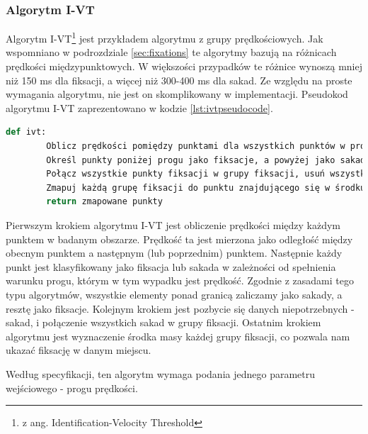 \subsubsection{Algorytm I-VT}
\label{ssec:ivt}
Algorytm I-VT\footnote{z ang. Identification-Velocity Threshold} jest przykładem algorytmu z grupy prędkościowych. Jak wspomniano w podrozdziale \ref{sec:fixations} te algorytmy bazują na różnicach prędkości międzypunktowych. W większości przypadków te różnice wynoszą mniej niż 150 ms dla fiksacji, a więcej niż 300-400 ms dla sakad. Ze względu na proste wymagania algorytmu, nie jest on skomplikowany w implementacji. Pseudokod algorytmu I-VT zaprezentowano w kodzie \ref{lst:ivtpseudocode}.
\begin{lstlisting}[language=Python, caption=Pseudokod algorytmu I-VT, label={lst:ivtpseudocode}]
    def ivt:
        Oblicz prędkości pomiędzy punktami dla wszystkich punktów w protokole
        Określ punkty poniżej progu jako fiksacje, a powyżej jako sakady
        Połącz wszystkie punkty fiksacji w grupy fiksacji, usuń wszystkie sakady
        Zmapuj każdą grupę fiksacji do punktu znajdującego się w środku każdej grupy
        return zmapowane punkty
\end{lstlisting}
Pierwszym krokiem algorytmu I-VT jest obliczenie prędkości między każdym punktem w badanym obszarze. Prędkość ta jest mierzona jako odległość między obecnym punktem a następnym (lub poprzednim) punktem. Następnie każdy punkt jest klasyfikowany jako fiksacja lub sakada w zależności od spełnienia warunku progu, którym w tym wypadku jest prędkość. Zgodnie z zasadami tego typu algorytmów, wszystkie elementy ponad granicą zaliczamy jako sakady, a resztę jako fiksacje. Kolejnym krokiem jest pozbycie się danych niepotrzebnych - sakad, i połączenie wszystkich sakad w grupy fiksacji. Ostatnim krokiem algorytmu jest wyznaczenie środka masy każdej grupy fiksacji, co pozwala nam ukazać fiksację w danym miejscu.\par
Według specyfikacji, ten algorytm wymaga podania jednego parametru wejściowego - progu prędkości.
